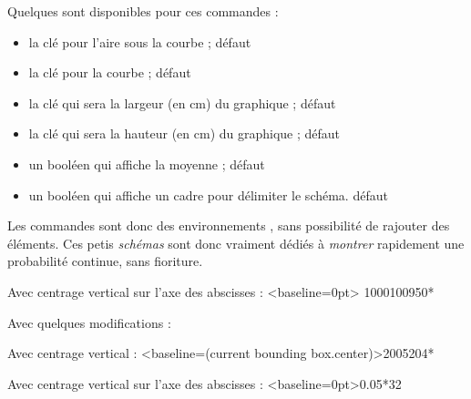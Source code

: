 \begin{cautionblock}
Quelques  sont disponibles pour ces commandes :

\begin{itemize}
	\item la clé  pour l'aire sous la courbe ; \hfill{}défaut 
	\item la clé  pour la courbe ; \hfill{}défaut 
	\item la clé  qui sera la largeur (en cm) du graphique ; \hfill{}défaut 
	\item la clé  qui sera la hauteur (en cm) du graphique ; \hfill{}défaut 
	\item un booléen  qui affiche la moyenne ; \hfill{}défaut 
	\item un booléen  qui affiche un cadre pour délimiter le schéma. \hfill{}défaut 
\end{itemize}
\vspace*{-\baselineskip}\leavevmode
\end{cautionblock}

\begin{noteblock}
Les commandes sont donc des environnements \TikZ, sans possibilité de \og rajouter \fg{} des éléments. Ces petis \textit{schémas} sont donc vraiment dédiés à \textit{montrer} rapidement une probabilité continue, sans fioriture.
\end{noteblock}

\begin{PresCodePL}{}
Avec centrage vertical sur l'axe des abscisses :
\LoiNormaleGraphe
	[AfficheM=false,CouleurCourbe=blue,CouleurAire=cyan]<baseline=0pt>%
	{1000}{100}{950}{*}
\end{PresCodePL}

\begin{PresCodePL}{}
Avec quelques modifications :


\medskip

Avec centrage vertical :
\LoiNormaleGraphe[Largeur=5,Hauteur=2.5]<baseline=(current bounding box.center)>{200}{5}{204}{*}

\medskip

Avec centrage vertical sur l'axe des abscisses :
\LoiExpoGraphe
	[AfficheM=false,CouleurCourbe=blue,CouleurAire=cyan]<baseline=0pt>{0.05}{*}{32}

\medskip

\end{PresCodePL}

